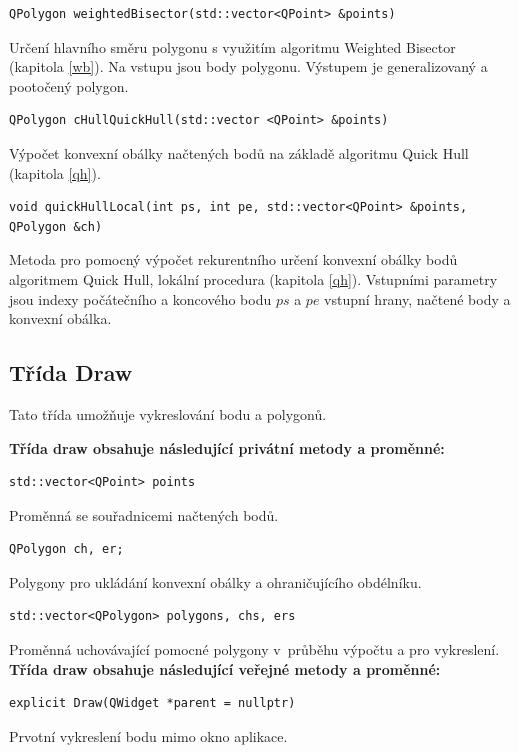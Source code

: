 \documentclass[a4paper, 12pt, oneside, titlepage]{article} %
\begin{document}
\begin{verbatim}
QPolygon weightedBisector(std::vector<QPoint> &points)
\end{verbatim}
Určení hlavního směru polygonu s využitím algoritmu Weighted Bisector (kapitola \ref{wb}). Na vstupu jsou body polygonu. Výstupem je generalizovaný a pootočený polygon.\\

\begin{verbatim}
QPolygon cHullQuickHull(std::vector <QPoint> &points)
\end{verbatim}
Výpočet konvexní obálky načtených bodů na základě algoritmu Quick Hull (kapitola \ref{qh}).\\

\begin{verbatim}
void quickHullLocal(int ps, int pe, std::vector<QPoint> &points, QPolygon &ch)
\end{verbatim}
Metoda pro pomocný výpočet rekurentního určení konvexní obálky bodů algoritmem Quick Hull, lokální procedura (kapitola \ref{qh}). Vstupními parametry jsou indexy počátečního a koncového bodu $ps$ a $pe$ vstupní hrany, načtené body a konvexní obálka.\\

    
    
\subsection{Třída Draw}
Tato třída umožňuje vykreslování bodu a polygonů.

\textbf{Třída draw obsahuje následující privátní metody a proměnné:}
\begin{verbatim}
std::vector<QPoint> points
\end{verbatim}
Proměnná se souřadnicemi načtených bodů.\\

\begin{verbatim}
QPolygon ch, er;
\end{verbatim}
Polygony pro ukládání konvexní obálky a ohraničujícího obdélníku.\\

\begin{verbatim}
std::vector<QPolygon> polygons, chs, ers
\end{verbatim}
Proměnná uchovávající pomocné polygony v~průběhu výpočtu a pro vykreslení.\\


\textbf{Třída draw obsahuje následující veřejné metody a proměnné:}
\begin{verbatim}
explicit Draw(QWidget *parent = nullptr)
\end{verbatim}
Prvotní vykreslení bodu mimo okno aplikace.\\
\end{document}
